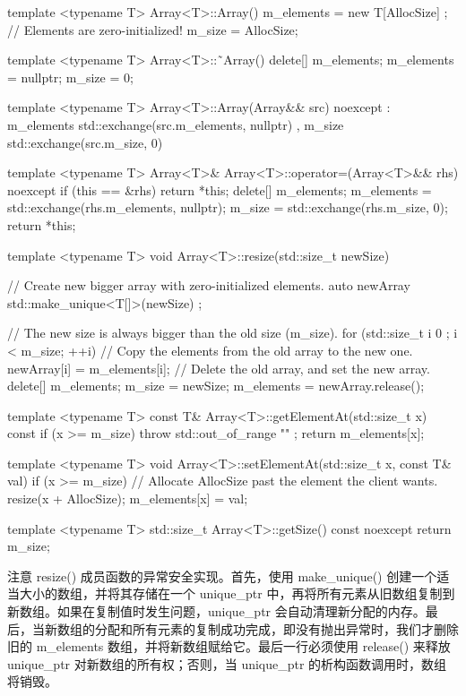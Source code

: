 \begin{cpp}
template <typename T> Array<T>::Array()
{
    m_elements = new T[AllocSize] {}; // Elements are zero-initialized!
    m_size = AllocSize;
}

template <typename T> Array<T>::˜Array()
{
    delete[] m_elements;
    m_elements = nullptr;
    m_size = 0;
}

template <typename T> Array<T>::Array(Array&& src) noexcept
: m_elements { std::exchange(src.m_elements, nullptr) }
, m_size { std::exchange(src.m_size, 0) }
{}

template <typename T> Array<T>& Array<T>::operator=(Array<T>&& rhs) noexcept
{
    if (this == &rhs) { return *this; }
    delete[] m_elements;
    m_elements = std::exchange(rhs.m_elements, nullptr);
    m_size = std::exchange(rhs.m_size, 0);
    return *this;
}

template <typename T> void Array<T>::resize(std::size_t newSize)
{
    // Create new bigger array with zero-initialized elements.
    auto newArray { std::make_unique<T[]>(newSize) };

    // The new size is always bigger than the old size (m_size).
    for (std::size_t i { 0 }; i < m_size; ++i) {
        // Copy the elements from the old array to the new one.
        newArray[i] = m_elements[i];
    }
    // Delete the old array, and set the new array.
    delete[] m_elements;
    m_size = newSize;
    m_elements = newArray.release();
}

template <typename T> const T& Array<T>::getElementAt(std::size_t x) const
{
    if (x >= m_size) { throw std::out_of_range { "" }; }
    return m_elements[x];
}

template <typename T> void Array<T>::setElementAt(std::size_t x, const T& val)
{
    if (x >= m_size) {
        // Allocate AllocSize past the element the client wants.
        resize(x + AllocSize);
    }
    m_elements[x] = val;
}

template <typename T> std::size_t Array<T>::getSize() const noexcept
{
    return m_size;
}
\end{cpp}

注意 resize() 成员函数的异常安全实现。首先，使用 make\_unique() 创建一个适当大小的数组，并将其存储在一个 unique\_ptr 中，再将所有元素从旧数组复制到新数组。如果在复制值时发生问题，unique\_ptr 会自动清理新分配的内存。最后，当新数组的分配和所有元素的复制成功完成，即没有抛出异常时，我们才删除旧的 m\_elements 数组，并将新数组赋给它。最后一行必须使用 release() 来释放 unique\_ptr 对新数组的所有权；否则，当 unique\_ptr 的析构函数调用时，数组将销毁。

